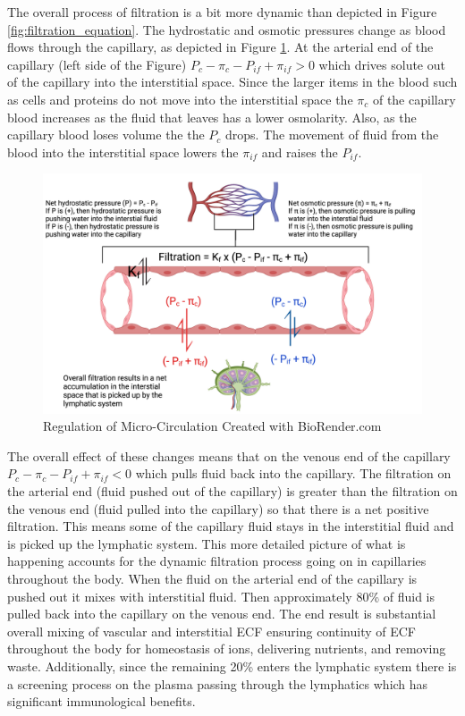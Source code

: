The overall process of filtration is a bit more dynamic than depicted in Figure \ref{fig:filtration_equation}. The hydrostatic and osmotic pressures change as blood flows through the capillary, as depicted in Figure \ref{fig:Microcirculation_Regulation}. At the arterial end of the capillary (left side of the Figure) $P_c - \pi_c - P_{if} + \pi_{if} > 0$ which drives solute out of the capillary into the interstitial space. Since the larger items in the blood such as cells and proteins do not move into the interstitial space the $\pi_c$ of the capillary blood increases as the fluid that leaves has a lower osmolarity. Also, as the capillary blood loses volume the the $P_c$ drops. The movement of fluid from the blood into the interstitial space lowers the $\pi_{if}$ and raises the $P_{if}$.

\begin{figure}[!h]
    \centering
    \includegraphics[width=1\linewidth]{./figure/Microcirculation_Regulation.png}
    \caption{Regulation of Micro-Circulation \footnotesize{Created with BioRender.com}}
    \label{fig:Microcirculation_Regulation}
\end{figure}

The overall effect of these changes means that on the venous end of the capillary $P_c - \pi_c - P_{if} + \pi_{if} < 0$ which pulls fluid back into the capillary.  The filtration on the arterial end (fluid pushed out of the capillary) is greater than the filtration on the venous end (fluid pulled into the capillary) so that there is a net positive filtration. This means some of the capillary fluid stays in the interstitial fluid and is picked up the lymphatic system. This more detailed picture of what is happening accounts for the dynamic filtration process going on in capillaries throughout the body. When the fluid on the arterial end of the capillary is pushed out it mixes with interstitial fluid. Then approximately 80\% of fluid is pulled back into the capillary on the venous end. The end result is substantial overall mixing of vascular and interstitial ECF ensuring continuity of ECF throughout the body for homeostasis of ions, delivering nutrients, and removing waste. Additionally, since the remaining 20\% enters the lymphatic system there is a screening process on the plasma passing through the lymphatics which has significant immunological benefits.

